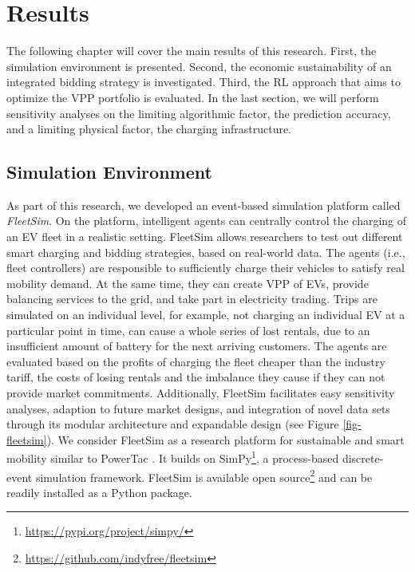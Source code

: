 \documentclass[a4paper, 12pt]{article}
\let\cite\shortcite
\begin{document}
\clearpage

\section{Results}
\label{sec:org8c76ff3}
The following chapter will cover the main results of this research. First, the
simulation environment is presented. Second, the economic sustainability of an
integrated bidding strategy is investigated. Third, the RL approach that aims to
optimize the VPP portfolio is evaluated. In the last section, we will perform
sensitivity analyses on the limiting algorithmic factor, the prediction
accuracy, and a limiting physical factor, the charging infrastructure.

\subsection{Simulation Environment}
\label{sec:org76d45b4}
As part of this research, we developed an event-based simulation platform called
\emph{FleetSim}. On the platform, intelligent agents can centrally control the
charging of an EV fleet in a realistic setting. FleetSim allows researchers to
test out different smart charging and bidding strategies, based on real-world
data. The agents (i.e., fleet controllers) are responsible to sufficiently
charge their vehicles to satisfy real mobility demand. At the same time, they
can create VPP of EVs, provide balancing services to the grid, and take part in
electricity trading. Trips are simulated on an individual level, for example,
not charging an individual EV at a particular point in time, can cause a whole
series of lost rentals, due to an insufficient amount of battery for the next
arriving customers. The agents are evaluated based on the profits of charging
the fleet cheaper than the industry tariff, the costs of losing rentals and the
imbalance they cause if they can not provide market commitments. Additionally,
FleetSim facilitates easy sensitivity analyses, adaption to future market
designs, and integration of novel data sets through its modular architecture and
expandable design (see Figure \ref{fig-fleetsim}). We consider FleetSim as a
research platform for sustainable and smart mobility similar to PowerTac
\cite{ketter16_multiagent_comp_gaming}. It builds on SimPy\footnote{\url{https://pypi.org/project/simpy/}\label{org1e78065}}, a process-based
discrete-event simulation framework. FleetSim is available open source\footnote{\url{https://github.com/indyfree/fleetsim}} and
can be readily installed as a Python package.
\end{document}
